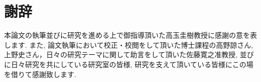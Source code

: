 \documentclass[a4j,11pt]{jarticle}
\begin{document}
\clearpage
\pagestyle{plain}
\section*{謝辞}
本論文の執筆並びに研究を進める上で御指導頂いた高玉圭樹教授に感謝の意を表します. 
また, 論文執筆において校正・校閲をして頂いた博士課程の高野諒さん,上野史さん，日々の研究テーマに関して助言をして頂いた佐藤寛之准教授, 並びに日々研究を共にしている研究室の皆様, 研究を支えて頂いている皆様にこの場を借りて感謝致します. 

\clearpage
\newpage
{}



\end{document}
